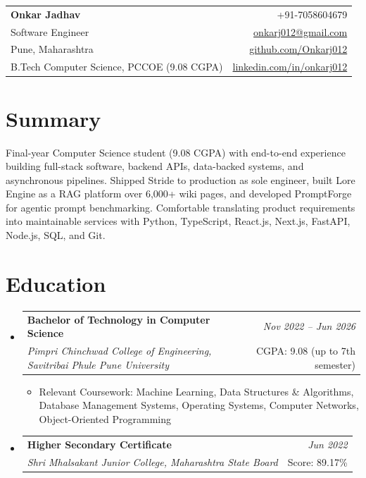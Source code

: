 \documentclass[a4paper,11pt]{article}
\makeatletter
\newcommand{\resumeSubheading}[4]{
\vspace{0.5mm}\item
    \begin{tabular*}{0.98\textwidth}[t]{l@{\extracolsep{\fill}}r}
        \textbf{#1} & \textit{\footnotesize{#4}} \\
        \textit{\footnotesize{#3}} & \footnotesize{#2}\\
    \end{tabular*}
    \vspace{-2.4mm}
}
\newcommand{\resumeSubHeadingListStart}{\begin{itemize}[leftmargin=*,labelsep=0mm]}
\newcommand{\resumeItemListStart}{\begin{justify}\begin{itemize}[leftmargin=3ex, rightmargin=2ex, noitemsep,labelsep=1.2mm,itemsep=0mm]\small}
\newcommand{\resumeSubHeadingListEnd}{\end{itemize}\vspace{2mm}}
\newcommand{\resumeItemListEnd}{\end{itemize}\end{justify}\vspace{-2mm}}
\newcommand{\name}{Onkar Jadhav}
\newcommand{\phone}{7058604679}
\newcommand{\emaila}{onkarj012@gmail.com}
\newcommand{\github}{github.com/Onkarj012}
\newcommand{\linkedin}{linkedin.com/in/onkarj012}
\makeatother
\begin{document}
\selectfont

\begin{tabularx}{\linewidth}{L r}
  \textbf{\Large \name} & {+91-\phone} \\
  {Software Engineer} & \href{mailto:\emaila}{\emaila} \\
  {Pune, Maharashtra} & \href{https://\github}{\github} \\
  {B.Tech Computer Science, PCCOE (9.08 CGPA)} & \href{https://\linkedin}{\linkedin}
\end{tabularx}
\vspace{-4mm}

\section{\textbf{Summary}}
\vspace{1mm}
\small{
Final-year Computer Science student (9.08 CGPA) with end-to-end experience building full-stack software, backend APIs, data-backed systems, and asynchronous pipelines. Shipped Stride to production as sole engineer, built Lore Engine as a RAG platform over 6,000+ wiki pages, and developed PromptForge for agentic prompt benchmarking. Comfortable translating product requirements into maintainable services with Python, TypeScript, React.js, Next.js, FastAPI, Node.js, SQL, and Git.
}
\vspace{-3mm}

\section{\textbf{Education}}
  \resumeSubHeadingListStart
    \resumeSubheading
      {Bachelor of Technology in Computer Science}{CGPA: 9.08 (up to 7th semester)}
      {Pimpri Chinchwad College of Engineering, Savitribai Phule Pune University}{Nov 2022 -- Jun 2026}
      \resumeItemListStart
        \item {Relevant Coursework: Machine Learning, Data Structures \& Algorithms, Database Management Systems, Operating Systems, Computer Networks, Object-Oriented Programming}
      \resumeItemListEnd
    \resumeSubheading
      {Higher Secondary Certificate}{Score: 89.17\%}
      {Shri Mhalsakant Junior College, Maharashtra State Board}{Jun 2022}
  \resumeSubHeadingListEnd
\vspace{-5.5mm}

\end{document}
